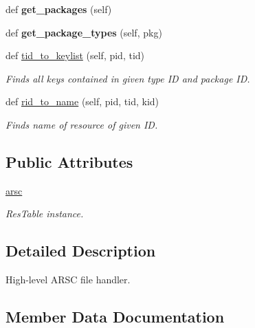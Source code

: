 \begin{DoxyCompactItemize}
\mbox{\label{classresources_1_1Arsc_a882d765b2466d97976d2a62d7660a9f3}} 
def {\bfseries get\+\_\+packages} (self)
\item 
\mbox{\label{classresources_1_1Arsc_a258382ad222ebfe9ce8a812ebf83b751}} 
def {\bfseries get\+\_\+package\+\_\+types} (self, pkg)
\item 
\mbox{\label{classresources_1_1Arsc_ab3d1342a21d6f3e9a157306188760ff8}} 
def \mbox{\hyperlink{classresources_1_1Arsc_ab3d1342a21d6f3e9a157306188760ff8}{tid\+\_\+to\+\_\+keylist}} (self, pid, tid)
\begin{DoxyCompactList}\small\item\em Finds all keys contained in given type ID and package ID. \end{DoxyCompactList}\item 
\mbox{\label{classresources_1_1Arsc_a1b7aacaf680038138b1a25557170906d}} 
def \mbox{\hyperlink{classresources_1_1Arsc_a1b7aacaf680038138b1a25557170906d}{rid\+\_\+to\+\_\+name}} (self, pid, tid, kid)
\begin{DoxyCompactList}\small\item\em Finds name of resource of given ID. \end{DoxyCompactList}\end{DoxyCompactItemize}
\subsection*{Public Attributes}
\begin{DoxyCompactItemize}
\item 
\mbox{\hyperlink{classresources_1_1Arsc_ad0913280798b82e38c02d03dfa41a677}{arsc}}
\begin{DoxyCompactList}\small\item\em Res\+Table instance. \end{DoxyCompactList}\end{DoxyCompactItemize}


\subsection{Detailed Description}
High-\/level A\+R\+SC file handler. 

\subsection{Member Data Documentation}
\mbox{\label{classresources_1_1Arsc_ad0913280798b82e38c02d03dfa41a677}} 

